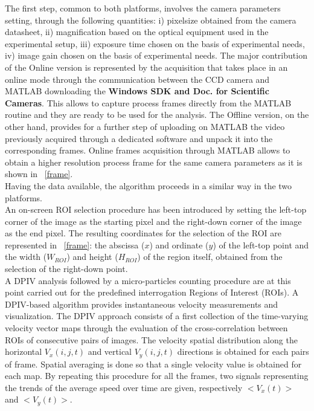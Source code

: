 \documentclass[journal]{IEEEtran}
\theoremstyle{definition}
\theoremstyle{remark}
\begin{document}
The first step, common to both platforms, involves the camera parameters setting, through the following quantities: i) pixelsize obtained from the camera datasheet, ii) magnification based on the optical equipment used in the experimental setup, iii) exposure time chosen on the basis of experimental needs, iv) image gain chosen on the basis of experimental needs. 
The major contribution of the Online version is represented by the acquisition that takes place in an online mode through the communication between the CCD camera and MATLAB downloading the \textbf{Windows SDK and Doc. for Scientific Cameras}. This allows to capture process frames directly from the MATLAB routine and they are ready to be used for the analysis. The Offline version, on the other hand, provides for a further step of uploading on MATLAB the video previously acquired through a dedicated software and unpack it into the corresponding frames. 
Online frames acquisition through MATLAB allows to obtain a higher resolution process frame for the same camera parameters as it is shown in ~\fig\ref{frame}.
\\Having the data available, the algorithm proceeds in a similar way in the two platforms.
\\An on-screen ROI selection procedure has been introduced by setting the left-top corner of the image as the starting pixel and the right-down corner of the image as the end pixel. The resulting coordinates for the selection of the ROI are represented in ~\fig\ref{frame}: the abscissa ($x$) and ordinate ($y$) of the left-top point and the width ($W_{ROI}$) and height ($H_{ROI}$) of the region itself, obtained from the selection of the right-down point.
\\A DPIV analysis followed by a micro-particles counting procedure are at this point carried out for the predefined interrogation Regions of Interest (ROIs). A DPIV-based algorithm provides instantaneous velocity measurements and visualization. The DPIV approach  consists of a first collection of the time-varying velocity vector maps through the evaluation of the cross-correlation between ROIs of consecutive pairs of images. The velocity spatial distribution along the horizontal $V_x(i,j,t)$ and vertical $V_y(i,j,t)$ directions is obtained for each pairs of frame. Spatial averaging is done so that a single velocity value is obtained for each map. By repeating this procedure for all the frames, two signals representing the trends of the average speed over time are given, respectively $<V_x(t)>$ and $<V_y(t)>$.
\end{document}
